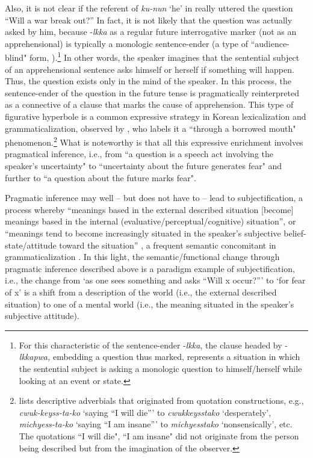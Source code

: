 \documentclass[output=paper,colorlinks,citecolor=brown]{langscibook}
\begin{document}
Also, it is not clear if the referent of \textit{ku-nun} `he' in  really uttered the question ``Will a war break out?'' In fact, it is not likely that the question was actually asked by him, because \nobreakdash-\textit{lkka} as a regular future interrogative marker (not as an apprehensional) is typically a monologic sentence-ender (a type of ``audience-blind" form, \citealt[105]{RheeKoo2017}).\footnote{For this characteristic of the sentence-ender \nobreakdash-\textit{lkka}, the clause headed by \nobreakdash-\textit{lkkapwa,} embedding a question thus marked, represents a situation in which the sentential subject is asking a monologic question to himself/herself while looking at an event or state.} In other words, the speaker imagines that the sentential subject of an apprehensional sentence asks himself or herself if something will happen. Thus, the question exists only in the mind of the speaker. In this process, the sentence-ender of the question in the future tense is pragmatically reinterpreted as a connective of a clause that marks the cause of apprehension. This type of figurative hyperbole is a common expressive strategy in Korean lexicalization and grammaticalization, observed by \citet{Rhee2009}, who labels it a ``through a borrowed mouth" phenomenon.\footnote{\citet{Rhee2009} lists descriptive adverbials that originated from quotation constructions, e.g., \textit{cwuk-keyss-ta-ko} `saying ``I will die''' to \textit{cwukkeysstako} `desperately', \textit{michyess-ta-ko} `saying ``I am insane''' to \textit{michyesstako} `nonsensically', etc. The quotations ``I will die", ``I am insane" did not originate from the person being described but from the imagination of the observer.} What is noteworthy is that all this expressive enrichment involves pragmatical inference, i.e., from ``a question is a speech act involving the speaker's uncertainty" to ``uncertainty about the future generates fear" and further to ``a question about the future marks fear".

Pragmatic inference may well -- but does not have to -- lead to subjectification, a process whereby ``meanings based in the external described situation [become] meanings based in the internal (evaluative/perceptual/cognitive) situation'', or ``meanings tend to become increasingly situated in the speaker's subjective belief-state/attitude toward the situation'' \citep[208--209]{TraugottKönig1991}, a frequent semantic concomitant in grammaticalization \citep{Traugott2003}. In this light, the semantic/functional change through pragmatic inference described above is a paradigm example of subjectification, i.e., the change from `as one sees something and asks ``Will x occur?''' to `for fear of x' is a shift from a description of the world (i.e., the external described situation) to one of a mental world (i.e., the meaning situated in the speaker's subjective attitude).
\end{document}
